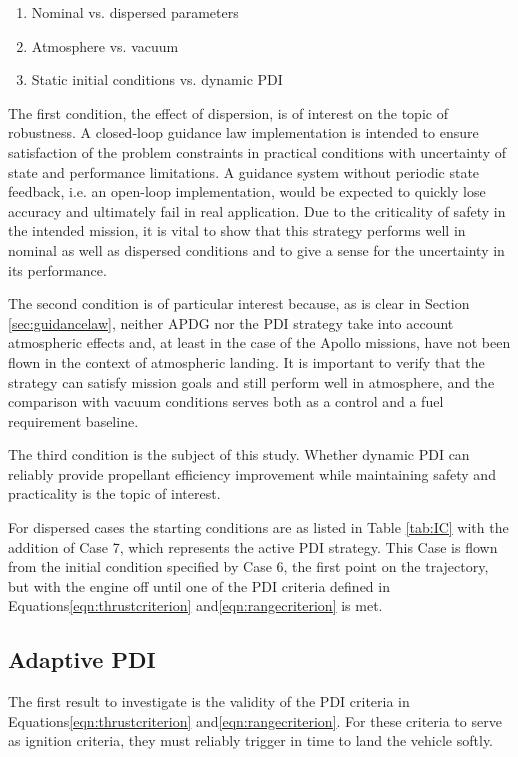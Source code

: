 \begin{enumerate}
	\item Nominal vs. dispersed parameters
	\item Atmosphere vs. vacuum
	\item Static initial conditions vs. dynamic PDI
\end{enumerate}

The first condition, the effect of dispersion, is of interest on the topic of robustness. A closed-loop guidance law implementation is intended to ensure satisfaction of the problem constraints in practical conditions with uncertainty of state and performance limitations. A guidance system without periodic state feedback, i.e. an open-loop implementation, would be expected to quickly lose accuracy and ultimately fail in real application. Due to the criticality of safety in the intended mission, it is vital to show that this strategy performs well in nominal as well as dispersed conditions and to give a sense for the uncertainty in its performance.

The second condition is of particular interest because, as is clear in Section \ref{sec:guidancelaw}, neither APDG nor the PDI strategy take into account atmospheric effects and, at least in the case of the Apollo missions, have not been flown in the context of atmospheric landing. It is important to verify that the strategy can satisfy mission goals and still perform well in atmosphere, and the comparison with vacuum conditions serves both as a control and a fuel requirement baseline. 

The third condition is the subject of this study. Whether dynamic PDI can reliably provide propellant efficiency improvement while maintaining safety and practicality is the topic of interest.

For dispersed cases the starting conditions are as listed in Table \ref{tab:IC} with the addition of Case 7, which represents the active PDI strategy. This Case is flown from the initial condition specified by Case 6, the first point on the trajectory, but with the engine off until one of the PDI criteria defined in Equations\:\ref{eqn:thrustcriterion} and\:\ref{eqn:rangecriterion} is met.

\subsection{Adaptive PDI} \label{sec:PDIres}
The first result to investigate is the validity of the PDI criteria in Equations\:\ref{eqn:thrustcriterion} and\:\ref{eqn:rangecriterion}. For these criteria to serve as ignition criteria, they must reliably trigger in time to land the vehicle softly.

